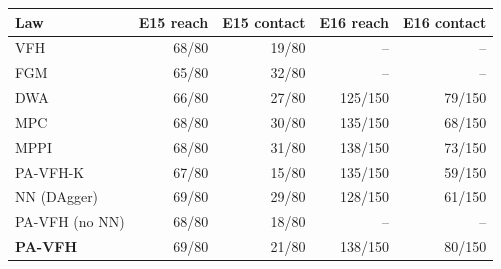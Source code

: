 \scriptsize
\setlength{\tabcolsep}{3pt}
\begin{tabular}{lrrrr}
\toprule
Law & E15 reach & E15 contact & E16 reach & E16 contact \\
\midrule
VFH & 68/80 & 19/80 & -- & -- \\
FGM & 65/80 & 32/80 & -- & -- \\
DWA & 66/80 & 27/80 & 125/150 & 79/150 \\
MPC & 68/80 & 30/80 & 135/150 & 68/150 \\
MPPI & 68/80 & 31/80 & 138/150 & 73/150 \\
PA-VFH-K & 67/80 & 15/80 & 135/150 & 59/150 \\
NN (DAgger) & 69/80 & 29/80 & 128/150 & 61/150 \\
PA-VFH (no NN) & 68/80 & 18/80 & -- & -- \\
\textbf{PA-VFH} & 69/80 & 21/80 & 138/150 & 80/150 \\
\bottomrule
\end{tabular}
